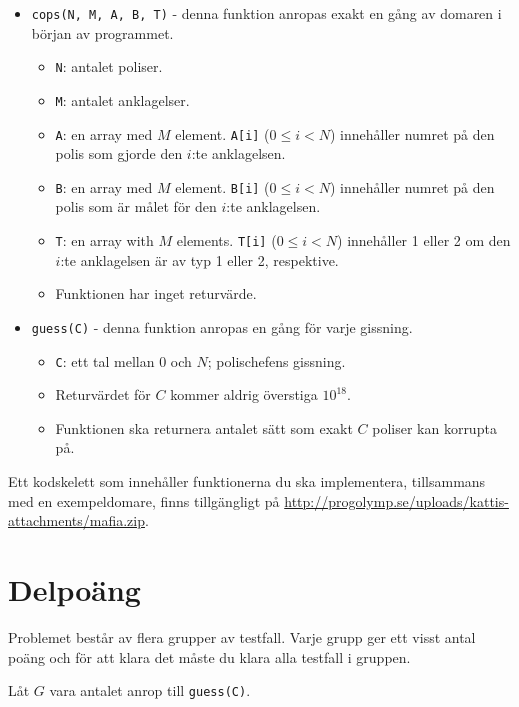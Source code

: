 \begin{itemize}
  \item \texttt{cops(N, M, A, B, T)} - denna funktion anropas exakt en gång av domaren i början av programmet.
  \begin{itemize}
    \item \texttt{N}: antalet poliser.
    \item \texttt{M}: antalet anklagelser.
    \item \texttt{A}: en array med $M$ element. \texttt{A[i]} ($0 \le i < N$) innehåller numret på den polis som gjorde den $i$:te anklagelsen.
    \item \texttt{B}: en array med $M$ element. \texttt{B[i]} ($0 \le i < N$) innehåller numret på den polis som är målet för den $i$:te anklagelsen.
    \item \texttt{T}: en array with $M$ elements. \texttt{T[i]} ($0 \le i < N$) innehåller 1 eller 2 om den $i$:te anklagelsen är av typ 1 eller 2, respektive.
		\item Funktionen har inget returvärde.
  \end{itemize}
\end{itemize}

\begin{itemize}
  \item \texttt{guess(C)} - denna funktion anropas en gång för varje gissning.
  \begin{itemize}
    \item \texttt{C}: ett tal mellan $0$ och $N$; polischefens gissning.
    \item Returvärdet för $C$ kommer aldrig överstiga $10^{18}$.
		\item Funktionen ska returnera antalet sätt som exakt $C$ poliser kan korrupta på.
  \end{itemize}
\end{itemize}

Ett kodskelett som innehåller funktionerna du ska implementera, tillsammans med en exempeldomare, finns tillgängligt på
\url{http://progolymp.se/uploads/kattis-attachments/mafia.zip}.

\section*{Delpoäng}
Problemet består av flera grupper av testfall. Varje grupp ger ett visst antal poäng och för att klara det måste du klara alla testfall i gruppen.

Låt $G$ vara antalet anrop till \texttt{guess(C)}.


